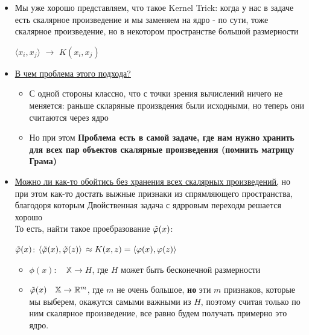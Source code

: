             \begin{itemize}
                \item  Мы уже хорошо представляем, что такое Kernel
                Trick: когда у нас в задаче есть скалярное произведение и мы заменяем на ядро - по сути, тоже скалярное произведение, но в некотором пространстве большой размерности
                \begin{center}
                    $\langle x_i, x_j \rangle$ $\longrightarrow$ $K(x_i, x_j)$
                \end{center}

                \item{\underline{В чем проблема этого подхода?}}

                \begin{itemize}
                    \item С одной стороны классно, что с точки зрения вычислений ничего не меняется: раньше скларяные произвдения были исходными, но теперь они считаются через ядро

                    \item Но при этом \textbf{Проблема есть в самой задаче, где нам нужно хранить для всех пар объектов скалярные произведения (помнить матрицу Грама)}
                \end{itemize}

                \item {\underline{Можно ли как-то обойтись без хранения всех скалярных произведений,} но при этом как-то достать выжные признаки из спрямляющего пространства, благодоря которым Двойственная задача с ядрровым переходм решается хорошо}\\

                То есть, найти такое проебразование $\Tilde{\phi}(x)$:
                \begin{center}
                \large
                    $\Tilde{\phi}(x)$: \quad $\langle \Tilde{\phi}(x), \Tilde{\phi}(z) \rangle \, \approx K(x, z) = \langle \phi(x), \phi(z) \rangle$
                \end{center}
                \begin{itemize}
                    \item $\phi(x): \quad \mathbb{X} \to H$, где $H$ может быть бесконечной размерности

                    \item $\Tilde{\phi}(x) \quad \mathbb{X} \to \mathbb{R}^m$, где $m$ не очень большое, \textbf{но} эти $m$ признаков, которые мы выберем, окажутся самыми важными из $H$, поэтому считая только по ним скалярное произведение, все равно будем получать примерно это ядро. 
                \end{itemize}
               
            \end{itemize}

